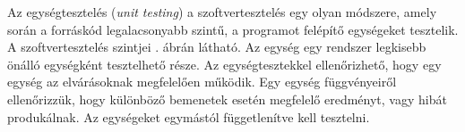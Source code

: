 








Az egységtesztelés (\emph{unit testing}) a szoftvertesztelés egy olyan módszere, amely során a forráskód legalacsonyabb szintű, a programot felépítő egységeket tesztelik. A szoftvertesztelés szintjei . ábrán látható. Az egység egy rendszer legkisebb önálló egységként tesztelhető része. Az egységtesztekkel ellenőrizhető, hogy egy egység az elvárásoknak megfelelően működik. Egy egység függvényeiről ellenőrizzük, hogy különböző bemenetek esetén megfelelő eredményt, vagy hibát produkálnak. Az egységeket egymástól függetlenítve kell tesztelni.

